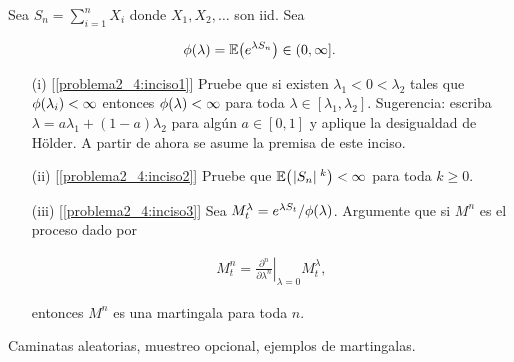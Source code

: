\begin{problema}
    Sea $S_n=\sum_{i=1}^n X_i$ donde $X_1,X_2,\ldots$ son iid. Sea
    
    \begin{align}
        \phi\!\left( \lambda\right) =\mathbb{E}\! \left( e^{\lambda S_n} \right)\in (0,\infty].
    \end{align}

    \begin{enumerate}
        \item[(i)]		[\ref{problema2_4:inciso1}]
            Pruebe que si existen $\lambda_1<0<\lambda_2$ tales que $\phi\!\left( \lambda_i\right) <\infty$ entonces $\phi\!\left( \lambda\right) <\infty$ 
			para toda $\lambda\in [\lambda_1,\lambda_2]$. Sugerencia: escriba $\lambda=a\lambda_1+(1-a)\lambda_2$ para alg\'un $a\in [0,1]$ 
			y aplique la desigualdad de H\"older. A partir de ahora se asume la premisa de este inciso.\pn
			
        \item[(ii)] 	[\ref{problema2_4:inciso2}]
            Pruebe que $\mathbb{E}\! \left( \hspace{.25mm}\left|S_n\right|\hspace{.25mm}^k \right)<\infty$ para toda $k\geq 0$.\pn
			
        \item[(iii)] 	[\ref{problema2_4:inciso3}]
            Sea $M^\lambda_t=e^{\lambda S_t}/\phi\!\left( \lambda\right) $. Argumente que si $M^n$ es el proceso dado por
            
            \begin{align}
                M^n_t=\left.\frac{\partial^n}{\partial \lambda^n}\right|_{\lambda=0}M^\lambda_t,
            \end{align}
            
            entonces $M^n$ es una martingala para toda $n$. \pn
%
    \end{enumerate}

     Caminatas aleatorias, muestreo opcional, ejemplos de martingalas. 
\end{problema}

